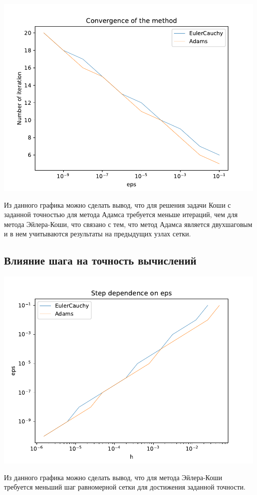 \includegraphics[scale=0.75]{1.pdf}

Из данного графика можно сделать вывод, что для решения задачи Коши с заданной точностью для метода Адамса требуется меньше итераций, чем для метода Эйлера-Коши, что связано с тем, что метод Адамса является двухшаговым и в нем учитываются результаты на предыдущих узлах сетки. 

\subsection{Влияние шага на точность вычислений}

\includegraphics[scale=0.75]{2.pdf}

Из данного графика можно сделать вывод, что для метода Эйлера-Коши требуется меньший шаг равномерной сетки для достижения заданной точности. 

